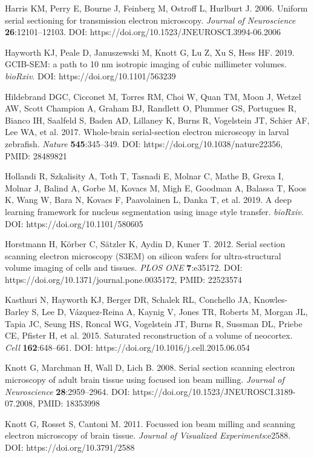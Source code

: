 \documentclass{article}
\newenvironment{reflist}{\par\small\setlength{\parindent}{0pt}\everypar{\hangindent=2.2em\hangafter=1}}{\par}
\begin{document}
\begin{reflist}
Harris KM, Perry E, Bourne J, Feinberg M, Ostroff L, Hurlburt J. 2006. Uniform serial sectioning for transmission electron microscopy. \emph{Journal of Neuroscience} \textbf{26}:12101–12103. DOI: https://doi.org/10.1523/JNEUROSCI.3994-06.2006

Hayworth KJ, Peale D, Januszewski M, Knott G, Lu Z, Xu S, Hess HF. 2019. GCIB-SEM: a path to 10 nm isotropic imaging of cubic millimeter volumes. \emph{bioRxiv}. DOI: https://doi.org/10.1101/563239

Hildebrand DGC, Cicconet M, Torres RM, Choi W, Quan TM, Moon J, Wetzel AW, Scott Champion A, Graham BJ, Randlett O, Plummer GS, Portugues R, Bianco IH, Saalfeld S, Baden AD, Lillaney K, Burns R, Vogelstein JT, Schier AF, Lee WA, et al. 2017. Whole-brain serial-section electron microscopy in larval zebrafish. \emph{Nature} \textbf{545}:345–349. DOI: https://doi.org/10.1038/nature22356, PMID: 28489821

Hollandi R, Szkalisity A, Toth T, Tasnadi E, Molnar C, Mathe B, Grexa I, Molnar J, Balind A, Gorbe M, Kovacs M, Migh E, Goodman A, Balassa T, Koos K, Wang W, Bara N, Kovacs F, Paavolainen L, Danka T, et al. 2019. A deep learning framework for nucleus segmentation using image style transfer. \emph{bioRxiv}. DOI: https://doi.org/10.1101/580605

Horstmann H, Körber C, Sätzler K, Aydin D, Kuner T. 2012. Serial section scanning electron microscopy (S3EM) on silicon wafers for ultra-structural volume imaging of cells and tissues. \emph{PLOS ONE} \textbf{7}:e35172. DOI: https://doi.org/10.1371/journal.pone.0035172, PMID: 22523574

Kasthuri N, Hayworth KJ, Berger DR, Schalek RL, Conchello JA, Knowles-Barley S, Lee D, Vázquez-Reina A, Kaynig V, Jones TR, Roberts M, Morgan JL, Tapia JC, Seung HS, Roncal WG, Vogelstein JT, Burns R, Sussman DL, Priebe CE, Pfister H, et al. 2015. Saturated reconstruction of a volume of neocortex. \emph{Cell} \textbf{162}:648–661. DOI: https://doi.org/10.1016/j.cell.2015.06.054

Knott G, Marchman H, Wall D, Lich B. 2008. Serial section scanning electron microscopy of adult brain tissue using focused ion beam milling. \emph{Journal of Neuroscience} \textbf{28}:2959–2964. DOI: https://doi.org/10.1523/JNEUROSCI.3189-07.2008, PMID: 18353998

Knott G, Rosset S, Cantoni M. 2011. Focussed ion beam milling and scanning electron microscopy of brain tissue. \emph{Journal of Visualized Experiments}:e2588. DOI: https://doi.org/10.3791/2588


\end{reflist}
\end{document}
